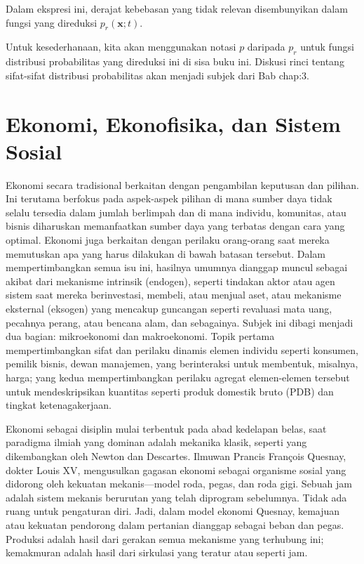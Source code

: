 \documentclass[a4paper,12pt]{book}
\begin{document}
Dalam ekspresi ini, derajat kebebasan yang tidak relevan disembunyikan dalam fungsi yang direduksi $p_r(\mathbf{x}; t)$.

Untuk kesederhanaan, kita akan menggunakan notasi $p$ daripada $p_r$ untuk fungsi distribusi probabilitas yang direduksi ini di sisa buku ini. Diskusi rinci tentang sifat-sifat distribusi probabilitas akan menjadi subjek dari Bab  {chap:3}.

\section{Ekonomi, Ekonofisika, dan Sistem Sosial}
\label{sec:1.5}

Ekonomi secara tradisional berkaitan dengan pengambilan keputusan dan pilihan. Ini terutama berfokus pada aspek-aspek pilihan di mana sumber daya tidak selalu tersedia dalam jumlah berlimpah dan di mana individu, komunitas, atau bisnis diharuskan memanfaatkan sumber daya yang terbatas dengan cara yang optimal. Ekonomi juga berkaitan dengan perilaku orang-orang saat mereka memutuskan apa yang harus dilakukan di bawah batasan tersebut. Dalam mempertimbangkan semua isu ini, hasilnya umumnya dianggap muncul sebagai akibat dari mekanisme intrinsik (endogen), seperti tindakan aktor atau agen sistem saat mereka berinvestasi, membeli, atau menjual aset, atau mekanisme eksternal (eksogen) yang mencakup guncangan seperti revaluasi mata uang, pecahnya perang, atau bencana alam, dan sebagainya. Subjek ini dibagi menjadi dua bagian: mikroekonomi dan makroekonomi. Topik pertama mempertimbangkan sifat dan perilaku dinamis elemen individu seperti konsumen, pemilik bisnis, dewan manajemen, yang berinteraksi untuk membentuk, misalnya, harga; yang kedua mempertimbangkan perilaku agregat elemen-elemen tersebut untuk mendeskripsikan kuantitas seperti produk domestik bruto (PDB) dan tingkat ketenagakerjaan.

Ekonomi sebagai disiplin mulai terbentuk pada abad kedelapan belas, saat paradigma ilmiah yang dominan adalah mekanika klasik, seperti yang dikembangkan oleh Newton dan Descartes. Ilmuwan Prancis François Quesnay, dokter Louis XV, mengusulkan gagasan ekonomi sebagai organisme sosial yang didorong oleh kekuatan mekanis—model roda, pegas, dan roda gigi. Sebuah jam adalah sistem mekanis berurutan yang telah diprogram sebelumnya. Tidak ada ruang untuk pengaturan diri. Jadi, dalam model ekonomi Quesnay, kemajuan atau kekuatan pendorong dalam pertanian dianggap sebagai beban dan pegas. Produksi adalah hasil dari gerakan semua mekanisme yang terhubung ini; kemakmuran adalah hasil dari sirkulasi yang teratur atau seperti jam.
\end{document}
